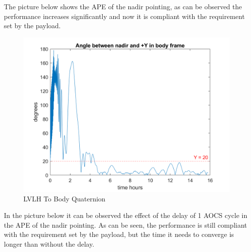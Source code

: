 \begin{itemize}
The picture below shows the APE of the nadir pointing, as can be observed the performance increases significantly and now it is compliant with the requirement set by the payload.

    \begin{figure}[H]
        \centering
        \includegraphics[width=0.7\linewidth]{res/img/Nadir_EKF/Simulations/Angle between nadir and +Y.png}
        \caption{LVLH To Body Quaternion}
    \end{figure}

In the picture below it can be observed the effect of the delay of 1 AOCS cycle in the APE of the nadir pointing. As can be seen, the performance is still compliant with the requirement set by the payload, but the time it needs to converge is longer than without the delay.


\end{itemize}
